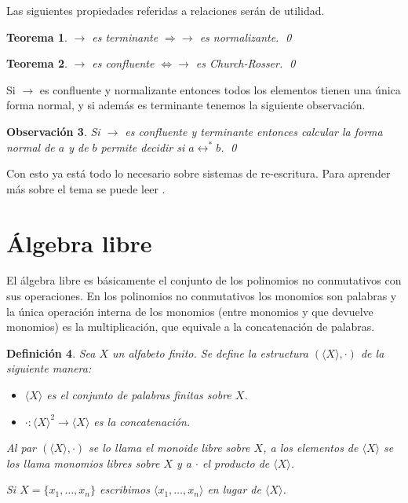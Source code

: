 \documentclass[12pt]{report}
\theoremstyle{customstyle}
\newtheorem{theorem}{Teorema}[chapter]
\newtheorem{definition}[theorem]{Definición}
\newtheorem{observation}[theorem]{Observación}
\theoremstyle{factstyle}
\begin{document}
Las siguientes propiedades referidas a relaciones serán de utilidad.

\begin{theorem}\label{thm:terminante ⇒ normalizante}
  $→$ es terminante $⇒ →$ es normalizante.
  \qed
\end{theorem}

\begin{theorem}\label{thm:confluente ⇔ Church-Rosser}
  $→$ es confluente $⇔ →$ es Church-Rosser.
  \qed
\end{theorem}

Si $→$ es confluente y normalizante entonces todos los elementos tienen una única forma normal, y si además es terminante tenemos la siguiente observación.

\begin{observation}\label{obs:→ confluente y terminante}
  Si $→$ es confluente y terminante entonces calcular la forma normal de $a$ y de $b$ permite decidir si $a ↔ ^* b$.
  \qed
\end{observation}

Con esto ya está todo lo necesario sobre sistemas de re-escritura. Para aprender más sobre el tema se puede leer \cite{book:term-rewriting}.

\section{Álgebra libre}

El álgebra libre es básicamente el conjunto de los polinomios no conmutativos con sus operaciones. En los polinomios no conmutativos los monomios son palabras y la única operación interna de los monomios (entre monomios y que devuelve monomios) es la multiplicación, que equivale a la concatenación de palabras.

\begin{definition}
  Sea $X$ un alfabeto finito. Se define la estructura $(⟨X⟩, ·)$ de la siguiente manera:
  \begin{itemize}
    \item $⟨X⟩$ es el conjunto de palabras finitas sobre $X$.
    \item $· : ⟨X⟩^2 → ⟨X⟩$ es la concatenación.
  \end{itemize}
  Al par $(⟨X⟩, ·)$ se lo llama el monoide libre sobre $X$, a los elementos de $⟨X⟩$ se los llama monomios libres sobre $X$ y a $·$ el producto de $⟨X⟩$.

  Si $X = \{x_1, …, x_n\}$ escribimos $⟨x_1, …, x_n⟩$ en lugar de $⟨X⟩$.
\end{definition}
\end{document}

